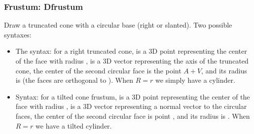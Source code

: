 \subsubsection{Frustum: Dfrustum}

Draw a truncated cone with a circular base (right or slanted). Two possible syntaxes:

\begin{itemize}
    \item The syntax:  for a right truncated cone,  is a 3D point representing the center of the face with radius ,  is a 3D vector representing the axis of the truncated cone, the center of the second circular face is the point $A+V$, and its radius is  (the faces are orthogonal to ). When $R=r$ we simply have a cylinder.

    \item Syntax:  for a tilted cone frustum,  is a 3D point representing the center of the face with radius ,  is a 3D vector representing a normal vector to the circular faces, the center of the second circular face is point , and its radius is . When $R=r$ we have a tilted cylinder.
\end{itemize}

